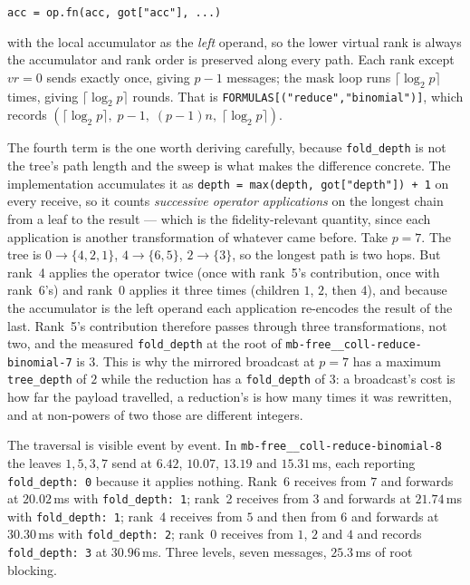 \documentclass[11pt]{article}
\begin{document}
\begin{center}
\texttt{acc = op.fn(acc, got["acc"], ...)}
\end{center}

with the local accumulator as the \emph{left} operand, so the lower virtual rank is always the
accumulator and rank order is preserved along every path. Each rank except $vr=0$ sends exactly
once, giving $p-1$ messages; the mask loop runs $\lceil\log_2 p\rceil$ times, giving
$\lceil\log_2 p\rceil$ rounds. That is \texttt{FORMULAS[("reduce","binomial")]}, which records
$(\lceil\log_2 p\rceil,\;p-1,\;(p-1)n,\;\lceil\log_2 p\rceil)$.

The fourth term is the one worth deriving carefully, because \texttt{fold\_depth} is not the
tree's path length and the sweep is what makes the difference concrete. The implementation
accumulates it as \texttt{depth = max(depth, got["depth"]) + 1} on every receive, so it counts
\emph{successive operator applications} on the longest chain from a leaf to the result --- which
is the fidelity-relevant quantity, since each application is another transformation of whatever
came before. Take $p=7$. The tree is $0 \to \{4, 2, 1\}$, $4 \to \{6, 5\}$, $2 \to \{3\}$, so
the longest path is two hops. But rank~4 applies the operator twice (once with rank~5's
contribution, once with rank~6's) and rank~0 applies it three times (children $1$, $2$, then
$4$), and because the accumulator is the left operand each application re-encodes the result of
the last. Rank~5's contribution therefore passes through three transformations, not two, and the
measured \texttt{fold\_depth} at the root of \texttt{mb-free\_\_coll-reduce-binomial-7} is $3$.
This is why the mirrored broadcast at $p=7$ has a maximum \texttt{tree\_depth} of $2$ while the
reduction has a \texttt{fold\_depth} of $3$: a broadcast's cost is how far the payload
travelled, a reduction's is how many times it was rewritten, and at non-powers of two those are
different integers.

The traversal is visible event by event. In \texttt{mb-free\_\_coll-reduce-binomial-8} the
leaves $1, 5, 3, 7$ send at $6.42$, $10.07$, $13.19$ and $15.31$\,ms, each reporting
\texttt{fold\_depth: 0} because it applies nothing. Rank~6 receives from $7$ and forwards at
$20.02$\,ms with \texttt{fold\_depth: 1}; rank~2 receives from $3$ and forwards at $21.74$\,ms
with \texttt{fold\_depth: 1}; rank~4 receives from $5$ and then from $6$ and forwards at
$30.30$\,ms with \texttt{fold\_depth: 2}; rank~0 receives from $1$, $2$ and $4$ and records
\texttt{fold\_depth: 3} at $30.96$\,ms. Three levels, seven messages, $25.3$\,ms of root
blocking.
\end{document}

